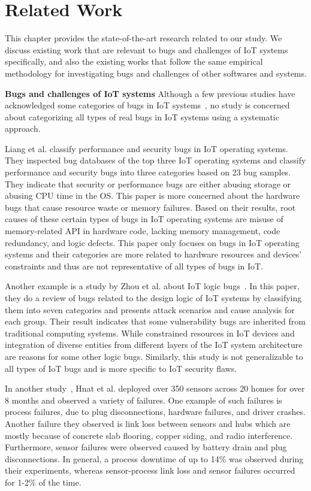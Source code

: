

\chapter{Related Work}
\label{ch:literature}
This chapter provides the state-of-the-art research related to our study. We discuss existing work that are relevant to bugs and challenges of IoT systems specifically, and also the existing works that follow the same empirical methodology for investigating bugs and challenges of other softwares and systems.

\textbf{Bugs and challenges of IoT systems}
Although a few previous studies have acknowledged some categories of bugs in IoT systems~\cite{IoTOSBugs,chen2017application,hnat2011hitchhiker}, no study is concerned about categorizing all types of real bugs in IoT systems using a systematic approach. 

Liang et al. \cite{IoTOSBugs} classify performance and security bugs in IoT operating systems. They inspected bug databases of the top three IoT operating systems and classify performance and security bugs into three categories based on 23 bug samples. They indicate that security or performance bugs are either abusing storage or abusing CPU time in the OS. This paper is more concerned about the hardware bugs that cause resource waste or memory failures. Based on their results, root causes of these certain types of bugs in IoT operating systems are misuse of memory-related API in hardware code, lacking memory management, code redundancy, and logic defects. This paper only focuses on bugs in IoT operating systems and their categories are more related to hardware resources and devices' constraints and thus are not representative of all types of bugs in IoT.  

Another example is a study by Zhou et al. about IoT logic bugs~\cite{zhou2019logic}. In this paper, they do a review of bugs related to the design logic of IoT systems by classifying them into seven categories and presents attack scenarios and cause analysis for each group. Their result indicates that some vulnerability bugs are inherited from traditional computing systems. While constrained resources in IoT devices and integration of diverse entities from different layers of the IoT system architecture are reasons for some other logic bugs. Similarly, this study is not generalizable to all types of IoT bugs and is more specific to IoT security flaws.

In another study~\cite{hnat2011hitchhiker}, Hnat et al. deployed over 350 sensors across 20 homes for over 8 months and observed a variety of failures. One example of such failures is process failures, due to plug disconnections, hardware failures, and driver crashes. Another failure they observed is link loss between sensors and hubs which are mostly because of concrete slab flooring, copper siding, and radio interference. Furthermore, sensor failures were observed caused by battery drain and plug disconnections. In general, a process downtime of up to 14\% was observed during their experiments, whereas sensor-process link loss and sensor failures occurred for 1-2\% of the time.

